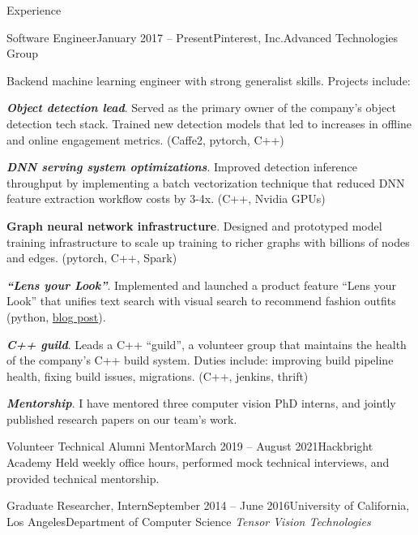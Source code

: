\documentclass{resume}
\begin{document}
\begin{component}{Experience}
  \vspace{0.25em}
  \begin{position}{Software Engineer}{January 2017 -- Present}{Pinterest, Inc.}{Advanced Technologies Group}
    {Backend machine learning engineer with strong generalist skills.
    Projects include:

    \textbf{\emph{Object detection lead}}. Served as the primary owner of the company's object detection tech stack. Trained new detection models that led to increases in offline and online engagement metrics. (Caffe2, pytorch, C++)

    \textbf{\emph{DNN serving system optimizations}}. Improved detection inference throughput by implementing a batch vectorization technique that reduced DNN feature extraction workflow costs by 3-4x. (C++, Nvidia GPUs)

    \textbf{Graph neural network infrastructure}. Designed and prototyped model training infrastructure to scale up training to richer graphs with billions of nodes and edges. (pytorch, C++, Spark)

    \textbf{\emph{``Lens your Look''}}. Implemented and launched a product feature ``Lens your Look'' that unifies text search with visual search to recommend fashion outfits (python, \href{https://medium.com/@Pinterest_Engineering/building-lens-your-look-unifying-text-and-camera-search-1b2f3ef4e393}{blog post}).

    \textbf{\emph{C++ guild}}. Leads a C++ ``guild'', a volunteer group that maintains the health of the company's C++ build system. Duties include: improving build pipeline health, fixing build issues, migrations. (C++, jenkins, thrift)

    \textbf{\emph{Mentorship}}. I have mentored three computer vision PhD interns, and jointly published research papers on our team's work.
    }
  \end{position}

\vspace{-1.0em}

  \begin{position}{Volunteer Technical Alumni Mentor}{March 2019 -- August 2021}{Hackbright Academy}{}
  {Held weekly office hours, performed mock technical interviews, and provided technical mentorship.}
  \end{position}

	\begin{position}{Graduate Researcher, Intern}{September 2014 -- June 2016}{University of California, Los Angeles}{Department of Computer Science}
	\emph{Tensor Vision Technologies}


\end{position}
\end{component}
\end{document}
